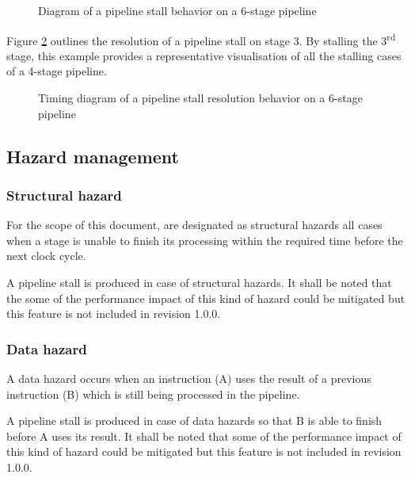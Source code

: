       \begin{figure}[H]
          \centering
          
          \caption{Diagram of a pipeline stall behavior on a 6-stage pipeline}
          \label{fig:pipeline-behavior-wait-stall}
        \end{figure}

      \begin{content}
          Figure \ref{fig:pipeline-behavior-wait-stall-resolution} outlines the resolution of a pipeline stall on stage 3. By stalling the 3\textsuperscript{rd} stage, this example provides a representative visualisation of all the stalling cases of a 4-stage pipeline.
        \end{content}

      \begin{figure}[H]
          \centering
          
          \caption{Timing diagram of a pipeline stall resolution behavior on a 6-stage pipeline}
          \label{fig:pipeline-behavior-wait-stall-resolution}
        \end{figure}

  \subsection{Hazard management}

    \subsubsection{Structural hazard}

      \begin{content}
          For the scope of this document, are designated as structural hazards all cases when a stage is unable to finish its processing within the required time before the next clock cycle.

          A pipeline stall is produced in case of structural hazards. It shall be noted that the some of the performance impact of this kind of hazard could be mitigated but this feature is not included in revision 1.0.0.
        \end{content}

    \subsubsection{Data hazard}

      \begin{content}
          A data hazard occurs when an instruction (A) uses the result of a previous instruction (B) which is still being processed in the pipeline.

          A pipeline stall is produced in case of data hazards so that B is able to finish before A uses its result. It shall be noted that some of the performance impact of this kind of hazard could be mitigated but this feature is not included in revision 1.0.0.
        \end{content}

